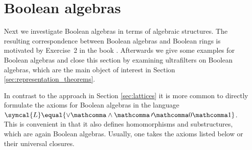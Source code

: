 \section{Boolean algebras}
\label{sec:boolean_algebras}

Next we investigate Boolean algebras
in terms of algebraic structures.
The resulting correspondence between Boolean algebras and Boolean rings
is motivated by Exercise~2 in the book
\cite[p.~18]{halmos:boolean_algebras}.
Afterwards we give some examples for Boolean algebras
and close this section by examining ultrafilters on Boolean algebras,
which are the main object of interest
in Section \ref{sec:representation_theorems}.

\medskip

In contrast to the approach in Section \ref{sec:lattices} it is more common
to directly formulate the axioms for Boolean algebras in the language
$\symcal{L} \equal \lbrace \vee \mathcomma \wedge \mathcomma
\, \prime \mathcomma 0 \mathcomma 1 \rbrace$.
This is convenient in that it also defines homomorphisms and substructures,
which are again Boolean algebras.
Usually, one takes the axioms listed below or their universal closures.

